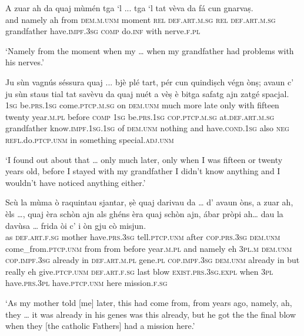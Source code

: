 \begin{linenumbers}
\gll A zuar ah da quaj mùmén tga `l ... tga `l tat vèva da fá cun gnarvaṣ. \\
and namely ah from \textsc{dem.m.unm} moment \textsc{rel} \textsc{def.art.m.sg} {} \textsc{rel} \textsc{def.art.m.sg} grandfather have.\textsc{impf.3sg} \textsc{comp} do.\textsc{inf} with nerve.\textsc{f.pl} \\ 
\end{linenumbers}
\medskip
\glt `Namely from the moment when my … when my grandfather had problems with his nerves.'
\medskip

\begin{linenumbers}
\gll  Ju sùn vagnús séssura quaj ... bjè plé tart, pér cun quindiṣch végn ònṣ; avaun c’ ju sùn staus tial tat savèvu da quaj nuét a vèṣ è bitga safatg ajn zatgé spacjal.\\
  \textsc{1sg} be.\textsc{prs.1sg} come.\textsc{ptcp.m.sg} on \textsc{dem.unm} {} much more late only with fifteen twenty year.\textsc{m.pl} before \textsc{comp} \textsc{1sg} be.\textsc{prs.1sg} \textsc{cop.ptcp.m.sg} at.\textsc{def.art.m.sg} grandfather know.\textsc{impf.1sg.1sg} of \textsc{dem.unm} nothing and have.\textsc{cond.1sg} also \textsc{neg} \textsc{refl.}do.\textsc{ptcp.unm} in something special.\textsc{adj.unm}\\
\end{linenumbers}
\medskip
\glt `I found out about that … only much later, only when I was fifteen or twenty years old, before I stayed with my grandfather I didn’t know anything and I wouldn’t have noticed anything either.'
\medskip

\begin{linenumbers}
\gll  Scù la mùma ò raquintau sjantar, ṣè quaj darivau da … d’ avaun òns, a zuar ah, èls …, quaj èra schòn ajn als ghéns èra quaj schòn ajn, ábar pròpi ah… dau la davùsa … frida òi c’ i òn gju cò misjun.  \\
as \textsc{def.art.f.sg} mother have.\textsc{prs.3sg} tell.\textsc{ptcp.unm} after \textsc{cop.prs.3sg} \textsc{dem.unm} come\_from.\textsc{ptcp.unm} from {} from before year.\textsc{m.pl} and namely eh \textsc{3pl.m} {} \textsc{dem.unm} \textsc{cop.impf.3sg} already in \textsc{def.art.m.pl} gene.\textsc{pl} \textsc{cop.impf.3sg} \textsc{dem.unm} already in but really eh give.\textsc{ptcp.unm} \textsc{def.art.f.sg} last {} blow  \textsc{exist.prs.3sg.expl} when \textsc{3pl} have.\textsc{prs.3pl} have.\textsc{ptcp.unm} here mission.\textsc{f.sg}  \\
\end{linenumbers}
\medskip
\glt `As my mother told [me] later, this had  come from, from years ago, namely, ah, they … it was already in his genes was this already, but he got the the final blow when they [the catholic Fathers] had a mission here.'
\medskip

